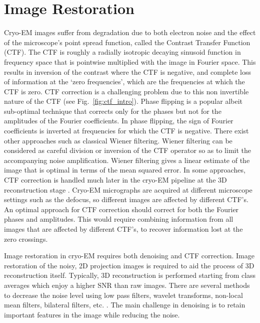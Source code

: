 \section{Image Restoration}
Cryo-EM images suffer from degradation due to both electron noise and the effect of the microscope's point spread function, called the Contrast Transfer Function (CTF). The CTF is roughly a radially isotropic decaying sinusoid function in frequency space that is pointwise multiplied with the image in Fourier space. This results in inversion of the contrast where the CTF is negative, and complete loss of information at the `zero frequencies', which are the frequencies at which the CTF is zero. CTF correction is a challenging problem due to this non invertible nature of the CTF (see Fig.~\ref{fig:ctf_intro}). Phase flipping \cite{rev2} is a popular albeit sub-optimal technique that corrects only for the phases but not for the amplitudes of the Fourier coefficients. In phase flipping, the sign of Fourier coefficients is inverted at frequencies for which the CTF is negative. There exist other approaches such as classical Wiener filtering. Wiener filtering can be considered as careful division or inversion of the CTF operator so as to limit the accompanying noise amplification. Wiener filtering gives a linear estimate of the image that is optimal in terms of the mean squared error. In some approaches, CTF correction is handled much later in the cryo-EM pipeline at the 3D reconstruction stage \cite{Penczek_image, imagic, eman2, spider}. Cryo-EM micrographs are acquired at different microscope settings such as the defocus, so different images are affected by different CTF's. An optimal approach for CTF correction should correct for both the Fourier phases and amplitudes. This would require combining information from all images that are affected by different CTF's, to recover information lost at the zero crossings.

Image restoration in cryo-EM requires both denoising and CTF correction. Image restoration of the noisy, 2D projection images is required to aid the process of 3D reconstruction itself. Typically, 3D reconstruction is performed starting from class averages which enjoy a higher SNR than raw images. There are several methods to decrease the noise level using low pass filters, wavelet transforms, non-local mean filters, bilateral filters, etc. \cite{Wang2013AZN, Jiang2003ApplicationsOA, Sorzano2006ImprovedBI, Wei2010211}. The main challenge in denoising is to retain important features in the image while reducing the noise.

